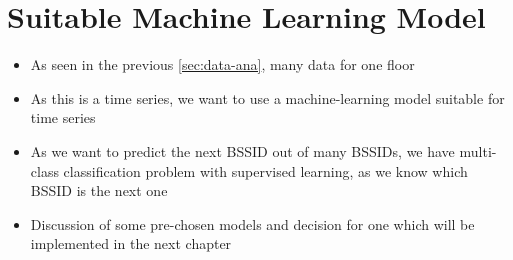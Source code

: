\chapter{Suitable Machine Learning Model}\label{sec:discuss-ml}


\begin{itemize}
    \item As seen in the previous \cref{sec:data-ana}, many data for one floor 
    \item As this is a time series, we want to use a  machine-learning model suitable for time series 
    \item As we want to predict the next BSSID out of many BSSIDs, we have multi-class classification problem with supervised learning, as we know which BSSID is the next one
    \item Discussion of some pre-chosen models and decision for one which will be implemented in the next chapter 
\end{itemize}

